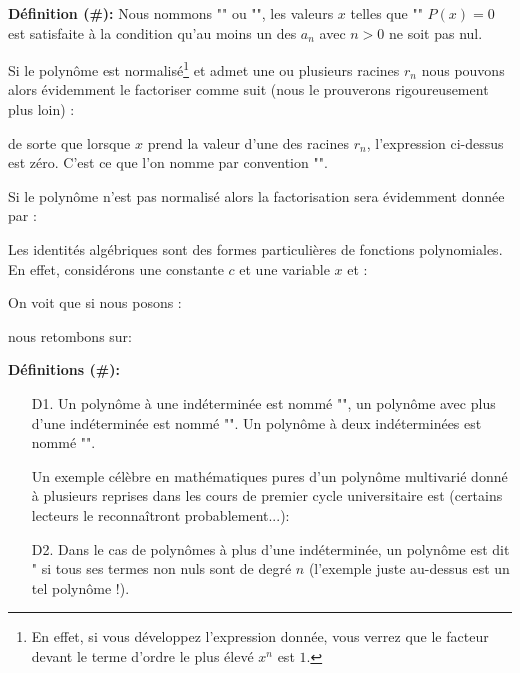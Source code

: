 	\textbf{Définition (\#\mydef):} Nous nommons "" ou "", les valeurs $x$ telles que "" $P(x)=0$ est satisfaite à la condition qu'au moins un des $a_n$ avec $n>0$ ne soit pas nul.
	
	Si le polynôme est normalisé\footnote{En effet, si vous développez l'expression donnée, vous verrez que le facteur devant le terme d'ordre le plus élevé $x^n$ est $1$.} et admet une ou plusieurs racines $r_n$ nous pouvons alors évidemment le factoriser comme suit (nous le prouverons rigoureusement plus loin) :
	
	de sorte que lorsque $x$ prend la valeur d'une des racines $r_n$, l'expression ci-dessus est zéro. C'est ce que l'on nomme par convention "".
	
	Si le polynôme n'est pas normalisé alors la factorisation sera évidemment donnée par :
	
	Les identités algébriques sont des formes particulières de fonctions polynomiales. En effet, considérons une constante $c$ et une variable $x$ et :
	
	On voit que si nous posons :
	
	nous retombons sur:
	
	\textbf{Définitions (\#\mydef):}
	\begin{enumerate}
		\item[D1.] Un polynôme à une indéterminée est nommé "", un polynôme avec plus d'une indéterminée est nommé "". Un polynôme à deux indéterminées est nommé "".
		
		Un exemple célèbre en mathématiques pures d'un polynôme multivarié donné à plusieurs reprises dans les cours de premier cycle universitaire est (certains lecteurs le reconnaîtront probablement...):
		
	
		\item[D2.] Dans le cas de polynômes à plus d'une indéterminée, un polynôme est dit " si tous ses termes non nuls sont de degré $n$ (l'exemple juste au-dessus est un tel polynôme !).
	\end{enumerate}
	
